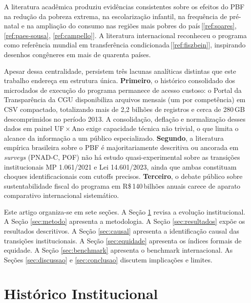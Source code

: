\documentclass[12pt,a4paper,oneside]{article}
\newcommand{\rs}{R\$\,}
\begin{document}
A literatura acadêmica produziu evidências consistentes sobre os
efeitos do PBF na redução da pobreza extrema, na escolarização
infantil, na frequência de pré-natal e na ampliação do consumo nas
regiões mais pobres do país\,[\ref{ref:soares}, \ref{ref:paes-sousa},
\ref{ref:campello}]. A literatura internacional reconheceu o
programa como referência mundial em transferência
condicionada\,[\ref{ref:fiszbein}], inspirando desenhos congêneres
em mais de quarenta países.

Apesar dessa centralidade, persistem três lacunas analíticas
distintas que este trabalho endereça em estrutura única.
\textbf{Primeiro}, o histórico consolidado dos microdados de
execução do programa permanece de acesso custoso: o Portal da
Transparência da CGU disponibiliza arquivos mensais (um por
competência) em CSV compactado, totalizando mais de 2,2 bilhões de
registros e cerca de 280\,GB descomprimidos no período
2013. A consolidação, deflação e normalização
desses dados em painel UF\,$\times$\,Ano exige capacidade técnica
não trivial, o que limita o alcance da informação a um público
especializado. \textbf{Segundo}, a literatura empírica brasileira
sobre o PBF é majoritariamente descritiva ou ancorada em
\textit{surveys} (PNAD-C, POF) \textemdash{} não há estudo
quasi-experimental sobre as transições institucionais MP 1.061/2021
e Lei 14.601/2023, ainda que ambas constituam choques
identificacionais com cutoffs precisos. \textbf{Terceiro}, o debate
público sobre sustentabilidade fiscal do programa em \rs 140\,bilhões
anuais carece de aparato comparativo internacional sistemático.

Este artigo organiza-se em sete seções. A Seção
\ref{sec:teoria} revisa a evolução institucional. A Seção
\ref{sec:metodo} apresenta a metodologia. A Seção
\ref{sec:resultados} expõe os resultados descritivos. A Seção
\ref{sec:causal} apresenta a identificação causal das transições
institucionais. A Seção \ref{sec:equidade} apresenta os índices
formais de equidade. A Seção \ref{sec:benchmark} apresenta o
benchmark internacional. As Seções \ref{sec:discussao} e
\ref{sec:conclusao} discutem implicações e limites.

\section{Histórico Institucional}\label{sec:teoria}
\end{document}

